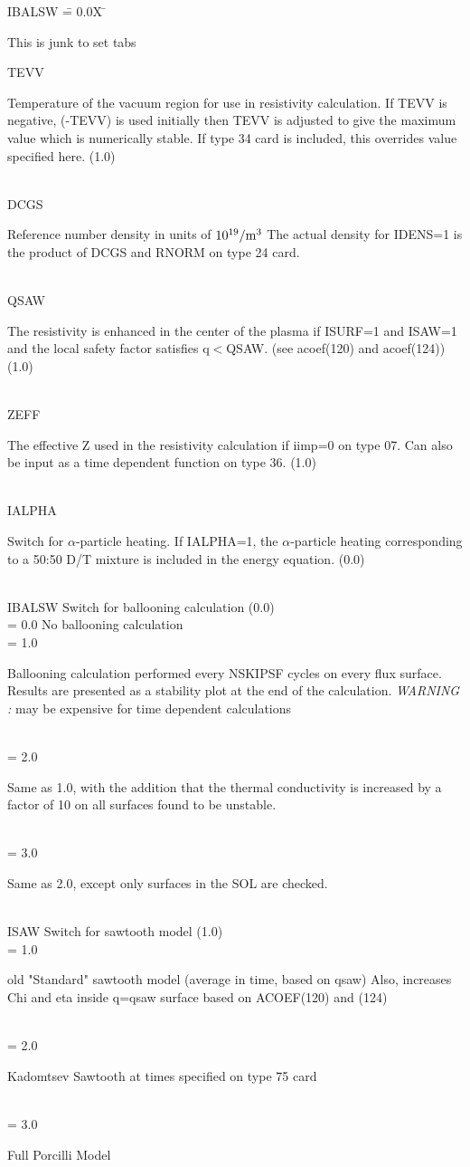 \begin{tabbing} 
IBALSW \= = 0.0X \= \parbox[t]{\width}{This is junk to set tabs} \kill 
TEVV \> \> \parbox[t]{\width}{Temperature of the vacuum region for use in resistivity  
calculation.  If TEVV is negative, (-TEVV) is used initially then TEVV is adjusted to give the
maximum value which is numerically stable.  If type 34 card is included, this overrides value
specified here. (1.0)}\\
DCGS \> \> \parbox[t]{\width}{Reference number density in units of $10^{19} / \rm m^3$  
The
actual density for IDENS=1 is the product of DCGS and RNORM on type 24 card.}\\
QSAW \> \> \parbox[t]{\width}{The resistivity is enhanced in the center of the plasma if
ISURF=1 and ISAW=1 and the local safety factor satisfies q$<$QSAW.
(see acoef(120) and acoef(124)) (1.0)}\\
ZEFF \> \> \parbox[t]{\width}{The effective Z used in the resistivity calculation if iimp=0 on type 07. 
Can also be input as a time dependent function on type 36. (1.0)} \\
IALPHA \> \> \parbox[t]{\width}{Switch for $\alpha$-particle heating. If IALPHA=1, the 
$\alpha$-particle heating corresponding to a 50:50 D/T mixture is included in the energy
equation. (0.0)}\\

IBALSW \> \> Switch for ballooning calculation (0.0)  \\
       \> = 0.0 \> No ballooning calculation\\
       \> = 1.0 \> \parbox[t]{\width}{Ballooning calculation performed every NSKIPSF cycles on
every flux surface.  Results are presented as a stability plot at the end of the calculation. {\em
WARNING :} may be expensive for time dependent calculations }\\
       \> = 2.0 \> \parbox[t]{\width}{Same as 1.0, with the addition that the thermal conductivity
is increased by a factor of 10 on all surfaces found to be unstable.}\\
  \> = 3.0 \> \parbox[t]{\width}{Same as 2.0, except only surfaces in the SOL are checked.}\\
ISAW \> \> Switch for sawtooth model (1.0) \\
       \> = 1.0 \> \parbox[t]{\width}{old "Standard" sawtooth model 
                 (average in time, based on qsaw)  Also, increases Chi and eta inside
                 q=qsaw surface based on ACOEF(120) and (124)}\\
       \> = 2.0 \> \parbox[t]{\width}{Kadomtsev Sawtooth at times specified on type 75 card}\\
       \> = 3.0 \> \parbox[t]{\width}{Full Porcilli Model}\\



\end{tabbing}
